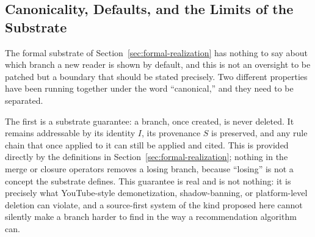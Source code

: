 \documentclass[11pt]{article}
\theoremstyle{definition}
\begin{document}
\subsection{Canonicality, Defaults, and the Limits of the Substrate}
\label{sec:governance-canonicality}

The formal substrate of Section~\ref{sec:formal-realization} has nothing to say about which branch a new reader is shown by default, and this is not an oversight to be patched but a boundary that should be stated precisely. Two different properties have been running together under the word ``canonical,'' and they need to be separated.

The first is a substrate guarantee: a branch, once created, is never deleted. It remains addressable by its identity $I$, its provenance $S$ is preserved, and any rule chain that once applied to it can still be applied and cited. This is provided directly by the definitions in Section~\ref{sec:formal-realization}; nothing in the merge or closure operators removes a losing branch, because ``losing'' is not a concept the substrate defines. This guarantee is real and is not nothing: it is precisely what YouTube-style demonetization, shadow-banning, or platform-level deletion can violate, and a source-first system of the kind proposed here cannot silently make a branch harder to find in the way a recommendation algorithm can.
\end{document}
